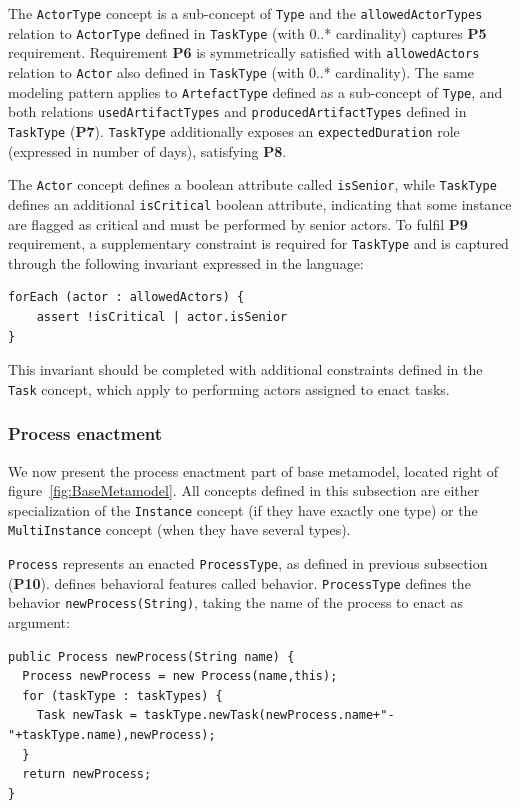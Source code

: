 The \texttt{ActorType} concept is a sub-concept of \texttt{Type} and the \texttt{allowedActorTypes} relation to \texttt{ActorType} defined in \texttt{TaskType} (with 0..* cardinality) captures \textbf{P5} requirement. Requirement \textbf{P6} is symmetrically satisfied with \texttt{allowedActors} relation to \texttt{Actor} also defined in \texttt{TaskType} (with 0..* cardinality). The same modeling pattern applies to \texttt{ArtefactType} defined as a sub-concept of \texttt{Type}, and both relations \texttt{usedArtifactTypes} and \texttt{producedArtifactTypes} defined in \texttt{TaskType} (\textbf{P7}). \texttt{TaskType} additionally exposes an \texttt{expectedDuration} role (expressed in number of days), satisfying \textbf{P8}.

The \texttt{Actor} concept defines a boolean attribute called \texttt{isSenior}, while \texttt{TaskType} defines an additional \texttt{isCritical} boolean attribute, indicating that some instance are flagged as critical and must be performed by senior actors. To fulfil \textbf{P9} requirement, a supplementary constraint is required for \texttt{TaskType} and is captured through the following invariant expressed in the \FML language:

\begin{lstlisting}
forEach (actor : allowedActors) {
    assert !isCritical | actor.isSenior
}
\end{lstlisting}

This invariant should be completed with additional constraints defined in the \texttt{Task} concept, which apply to performing actors assigned to enact tasks.

\subsubsection{Process enactment}
\label{sec:ProcessEnactment}
We now present the process enactment part of base metamodel, located right of figure~\ref{fig:BaseMetamodel}. All concepts defined in this subsection are either specialization of the \texttt{Instance} concept (if they have exactly one type) or the \texttt{MultiInstance} concept (when they have several types).

\texttt{Process} represents an enacted \texttt{ProcessType}, as defined in previous subsection (\textbf{P10}). \FML defines behavioral features called behavior. \texttt{ProcessType} defines the behavior \texttt{newProcess(String)}, taking the name of the process to enact as argument:

\begin{lstlisting}
public Process newProcess(String name) {
  Process newProcess = new Process(name,this);
  for (taskType : taskTypes) {
    Task newTask = taskType.newTask(newProcess.name+"-"+taskType.name),newProcess);
  }
  return newProcess;
}
\end{lstlisting}

